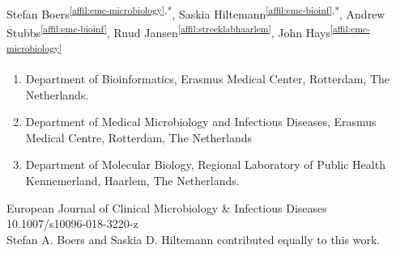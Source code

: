 \setcounter{NAT@ctr}{-1}

\chapter*{}
{}
Stefan Boers\textsuperscript{\ref{affil:emc-microbiology},*},
Saskia Hiltemann\textsuperscript{\ref{affil:emc-bioinf},*},
Andrew Stubbs\textsuperscript{\ref{affil:emc-bioinf}},
Ruud Jansen\textsuperscript{\ref{affil:streeklabhaarlem}},
John Hays\textsuperscript{\ref{affil:emc-microbiology}}

\small
\begin{enumerate}
\itemsep-0.5em
\item Department of Bioinformatics, Erasmus Medical Center, Rotterdam, The Netherlands. \label{affil:emc-bioinf}
\item Department of Medical Microbiology and Infectious Diseases, Erasmus Medical Centre, Rotterdam, The Netherlands \label{affil:emc-microbiology}
\item Department of Molecular Biology, Regional Laboratory of Public Health Kennemerland, Haarlem, The Netherlands. \label{affil:streeklabhaarlem}
\end{enumerate}

{\color{chaptergrey}{Published in:}} European Journal of Clinical Microbiology \& Infectious Diseases \\
{\color{chaptergrey}{DOI:}} 10.1007/s10096-018-3220-z \\
{\color{chaptergrey}{*:}} Stefan A. Boers and Saskia D. Hiltemann contributed equally to this work.

\normalsize

